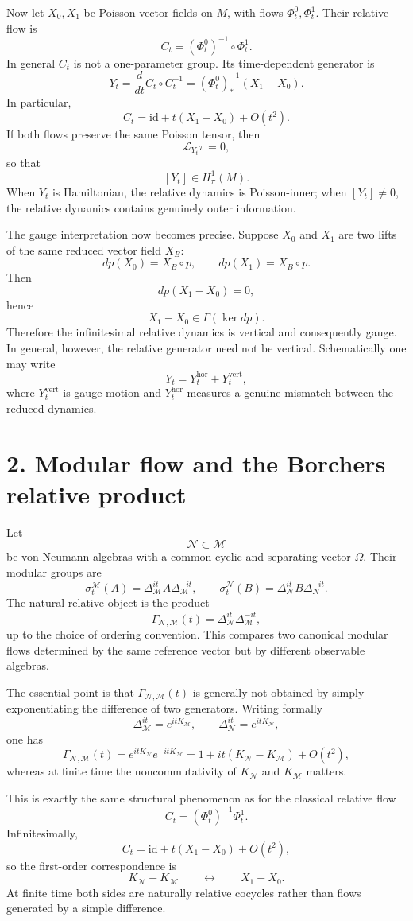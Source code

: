 \documentclass[11pt]{article}
\newcommand{\M}{\mathcal M}
\newcommand{\N}{\mathcal N}
\newcommand{\cL}{\mathcal L}
\newcommand{\id}{\mathrm{id}}
\begin{document}
Now let $X_0,X_1$ be Poisson vector fields on $M$, with flows
$\Phi_t^0,\Phi_t^1$.  Their relative flow is
\[
C_t=(\Phi_t^0)^{-1}\circ\Phi_t^1.
\]
In general $C_t$ is not a one-parameter group.  Its time-dependent generator is
\[
Y_t
=
\frac{d}{dt}C_t\circ C_t^{-1}
=
(\Phi_t^0)^{-1}_*(X_1-X_0).
\]
In particular,
\[
C_t=\id+t(X_1-X_0)+O(t^2).
\]
If both flows preserve the same Poisson tensor, then
\[
\cL_{Y_t}\pi=0,
\]
so that
\[
[Y_t]\in H_\pi^1(M).
\]
When $Y_t$ is Hamiltonian, the relative dynamics is Poisson-inner; when
$[Y_t]\neq0$, the relative dynamics contains genuinely outer information.

The gauge interpretation now becomes precise.  Suppose $X_0$ and $X_1$ are
two lifts of the same reduced vector field $X_B$:
\[
dp(X_0)=X_B\circ p,
\qquad
dp(X_1)=X_B\circ p.
\]
Then
\[
dp(X_1-X_0)=0,
\]
hence
\[
X_1-X_0\in\Gamma(\ker dp).
\]
Therefore the infinitesimal relative dynamics is vertical and consequently
gauge.  In general, however, the relative generator need not be vertical.
Schematically one may write
\[
Y_t=Y_t^{\mathrm{hor}}+Y_t^{\mathrm{vert}},
\]
where $Y_t^{\mathrm{vert}}$ is gauge motion and $Y_t^{\mathrm{hor}}$ measures a
genuine mismatch between the reduced dynamics.

\section*{2. Modular flow and the Borchers relative product}

Let
\[
\N\subset\M
\]
be von Neumann algebras with a common cyclic and separating vector $\Omega$.
Their modular groups are
\[
\sigma_t^\M(A)
=
\Delta_\M^{it}A\Delta_\M^{-it},
\qquad
\sigma_t^\N(B)
=
\Delta_\N^{it}B\Delta_\N^{-it}.
\]
The natural relative object is the product
\[
\Gamma_{\N,\M}(t)
=
\Delta_\N^{it}\Delta_\M^{-it},
\]
up to the choice of ordering convention.  This compares two canonical modular
flows determined by the same reference vector but by different observable
algebras.

The essential point is that $\Gamma_{\N,\M}(t)$ is generally not obtained by
simply exponentiating the difference of two generators.  Writing formally
\[
\Delta_\M^{it}=e^{itK_\M},
\qquad
\Delta_\N^{it}=e^{itK_\N},
\]
one has
\[
\Gamma_{\N,\M}(t)
=
e^{itK_\N}e^{-itK_\M}
=
1+it(K_\N-K_\M)+O(t^2),
\]
whereas at finite time the noncommutativity of $K_\N$ and $K_\M$ matters.

This is exactly the same structural phenomenon as for the classical relative
flow
\[
C_t=(\Phi_t^0)^{-1}\Phi_t^1.
\]
Infinitesimally,
\[
C_t
=
\id+t(X_1-X_0)+O(t^2),
\]
so the first-order correspondence is
\[
K_\N-K_\M
\qquad\longleftrightarrow\qquad
X_1-X_0.
\]
At finite time both sides are naturally relative cocycles rather than flows
generated by a simple difference.
\end{document}
